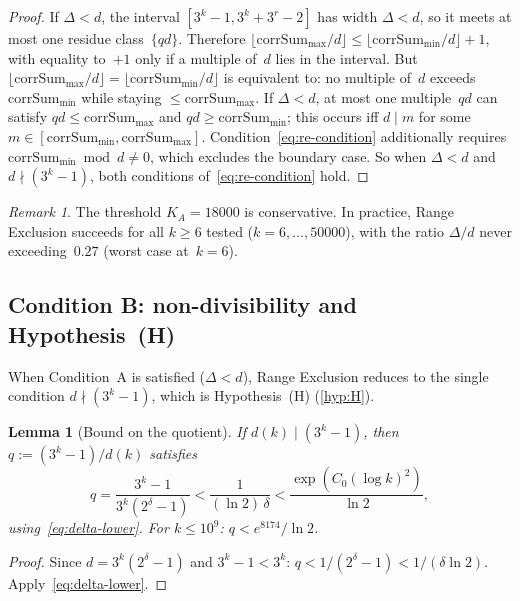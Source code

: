 \documentclass[11pt, a4paper]{amsart}
\theoremstyle{plain}
\newtheorem{lemma}[theorem]{Lemma}
\theoremstyle{definition}
\theoremstyle{remark}
\newtheorem{remark}[theorem]{Remark}
\newcommand{\corrSum}{\mathrm{corrSum}}
\begin{document}
\begin{proof}
  If $\Delta < d$, the interval
  $[3^k - 1, 3^k + 3^r - 2]$ has width $\Delta < d$,
  so it meets at most one residue class~$\{qd\}$.
  Therefore $\lfloor \corrSum_{\max}/d \rfloor \leq
  \lfloor \corrSum_{\min}/d \rfloor + 1$, with equality
  to~$+1$ only if a multiple of~$d$ lies in the interval.
  But $\lfloor \corrSum_{\max}/d \rfloor = \lfloor
  \corrSum_{\min}/d \rfloor$ is equivalent to: no multiple
  of~$d$ exceeds~$\corrSum_{\min}$ while staying
  $\leq \corrSum_{\max}$.  If $\Delta < d$, at most one
  multiple~$qd$ can satisfy $qd \leq \corrSum_{\max}$ and
  $qd \geq \corrSum_{\min}$; this occurs iff
  $d \mid m$ for some $m \in [\corrSum_{\min}, \corrSum_{\max}]$.
  Condition~\eqref{eq:re-condition} additionally requires
  $\corrSum_{\min} \bmod d \neq 0$, which excludes the boundary case.
  So when $\Delta < d$ and $d \nmid (3^k - 1)$, both conditions
  of~\eqref{eq:re-condition} hold.
\end{proof}

\begin{remark}\label{rem:KA-practical}
  The threshold $K_A = 18000$ is conservative.  In practice,
  Range Exclusion succeeds for all $k \geq 6$ tested
  ($k = 6, \ldots, 50000$), with the ratio $\Delta/d$ never
  exceeding~$0.27$ (worst case at~$k = 6$).
\end{remark}

\subsection{Condition B: non-divisibility and Hypothesis~(H)}
\label{ssec:condition-b}

When Condition~A is satisfied ($\Delta < d$), Range Exclusion
reduces to the single condition $d \nmid (3^k - 1)$, which
is Hypothesis~(H) (\cref{hyp:H}).

\begin{lemma}[Bound on the quotient]\label{lem:q-bound}
  If $d(k) \mid (3^k - 1)$, then $q := (3^k - 1)/d(k)$
  satisfies
  \begin{equation}\label{eq:q-bound}
    q = \frac{3^k - 1}{3^k(2^\delta - 1)}
    < \frac{1}{(\ln 2)\,\delta}
    < \frac{\exp(C_0(\log k)^2)}{\ln 2},
  \end{equation}
  using~\eqref{eq:delta-lower}.  For $k \leq 10^9$:
  $q < e^{8174}/\ln 2$.
\end{lemma}

\begin{proof}
  Since $d = 3^k(2^\delta - 1)$ and $3^k - 1 < 3^k$:
  $q < 1/(2^\delta - 1) < 1/(\delta \ln 2)$.
  Apply~\eqref{eq:delta-lower}.
\end{proof}
\end{document}
